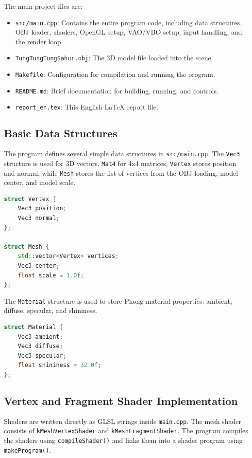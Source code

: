 \documentclass[12pt,a4paper]{article}
\begin{document}
The main project files are:

\begin{itemize}
    \item \texttt{src/main.cpp}: Contains the entire program code, including
    data structures, OBJ loader, shaders, OpenGL setup, VAO/VBO setup, input handling, and the render loop.
    \item \texttt{TungTungTungSahur.obj}: The 3D model file loaded into the scene.
    \item \texttt{Makefile}: Configuration for compilation and running the program.
    \item \texttt{README.md}: Brief documentation for building, running, and controls.
    \item \texttt{report\_en.tex}: This English LaTeX report file.
\end{itemize}

\subsection{Basic Data Structures}

The program defines several simple data structures in \texttt{src/main.cpp}.
The \texttt{Vec3} structure is used for 3D vectors, \texttt{Mat4} for 4x4 matrices,
\texttt{Vertex} stores position and normal, while \texttt{Mesh} stores the list of vertices
from the OBJ loading, model center, and model scale.

\begin{lstlisting}[language=C++]
struct Vertex {
    Vec3 position;
    Vec3 normal;
};

struct Mesh {
    std::vector<Vertex> vertices;
    Vec3 center;
    float scale = 1.0f;
};
\end{lstlisting}

The \texttt{Material} structure is used to store Phong material properties:
ambient, diffuse, specular, and shininess.

\begin{lstlisting}[language=C++]
struct Material {
    Vec3 ambient;
    Vec3 diffuse;
    Vec3 specular;
    float shininess = 32.0f;
};
\end{lstlisting}

\subsection{Vertex and Fragment Shader Implementation}

Shaders are written directly as GLSL strings inside \texttt{main.cpp}. The mesh
shader consists of \texttt{kMeshVertexShader} and \texttt{kMeshFragmentShader}.
The program compiles the shaders using \texttt{compileShader()} and links them
into a shader program using \texttt{makeProgram()}.
\end{document}
